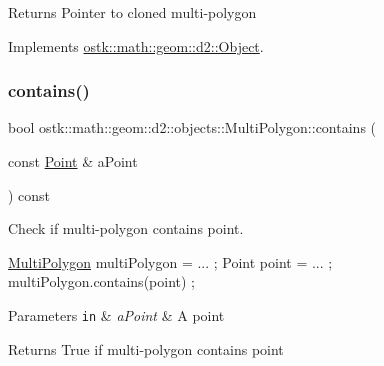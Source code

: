 \begin{DoxyReturn}{Returns}
Pointer to cloned multi-\/polygon 
\end{DoxyReturn}


Implements \hyperlink{classostk_1_1math_1_1geom_1_1d2_1_1_object_a98dedc6792aef35308966ca768eb3e14}{ostk\+::math\+::geom\+::d2\+::\+Object}.

\mbox{\label{classostk_1_1math_1_1geom_1_1d2_1_1objects_1_1_multi_polygon_a7b0795460707a8ee2cac31dfe7891466}} 
\subsubsection{\texorpdfstring{contains()}{contains()}\hspace{0.1cm}{\footnotesize\ttfamily [1/2]}}
{\footnotesize\ttfamily bool ostk\+::math\+::geom\+::d2\+::objects\+::\+Multi\+Polygon\+::contains (\begin{DoxyParamCaption}\item[{const \hyperlink{classostk_1_1math_1_1geom_1_1d2_1_1objects_1_1_point}{Point} \&}]{a\+Point }\end{DoxyParamCaption}) const}



Check if multi-\/polygon contains point. 


\begin{DoxyCode}
\hyperlink{classostk_1_1math_1_1geom_1_1d2_1_1objects_1_1_multi_polygon_ad65532c9b323b5358cdcdd43da5ef9bd}{MultiPolygon} multiPolygon = ... ;
Point point = ... ;
multiPolygon.contains(point) ;
\end{DoxyCode}



\begin{DoxyParams}[1]{Parameters}
\mbox{\tt in}  & {\em a\+Point} & A point \\
\hline
\end{DoxyParams}
\begin{DoxyReturn}{Returns}
True if multi-\/polygon contains point 
\end{DoxyReturn}
\mbox{\label{classostk_1_1math_1_1geom_1_1d2_1_1objects_1_1_multi_polygon_ad58e3e306864939951e8724bf9213d52}} 
